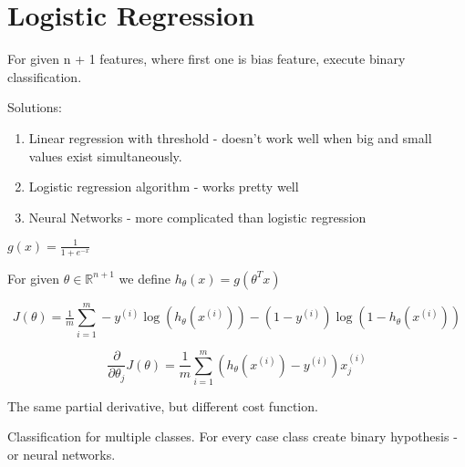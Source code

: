 \section{Logistic Regression}



\begin{problem}[classification]
    For given n + 1 features, where first one is bias feature, execute binary classification.
\end{problem}
Solutions:
\begin{enumerate}
    \item Linear regression with threshold - doesn't work well when big and small values exist simultaneously.
    \item Logistic regression algorithm - works pretty well
    \item Neural Networks - more complicated than logistic regression
\end{enumerate}
\begin{definition}
    $g(x) = \frac{1}{1 + e^{-x}}$
\end{definition}
\begin{definition}[hypothesis]
    For given $\theta \in \mathbb{R}^{n+1}$ we define $h_\theta(x) = g(\theta^T x)$
\end{definition}

\begin{definition}
    \begin{equation*}
        J(\theta) = \tfrac{1}{m}\sum\limits_{i=1}^{m} - y^{(i)} \log (h_\theta(x^{(i)}))  - ( 1 - y^{(i)}) \log (1 - h_\theta(x^{(i)}))
    \end{equation*}
\end{definition}

\begin{definition}
    \begin{equation*}
        \frac{\partial}{\partial \theta_j} J(\theta) = \frac{1}{m} \sum\limits_{i=1}^{m} (h_\theta(x^{(i)}) - y^{(i)})x^{(i)}_j
    \end{equation*}
\end{definition}

The same partial derivative, but different cost function.

\begin{problem}
    Classification for multiple classes. For every case class create binary hypothesis - or neural networks.
\end{problem}

